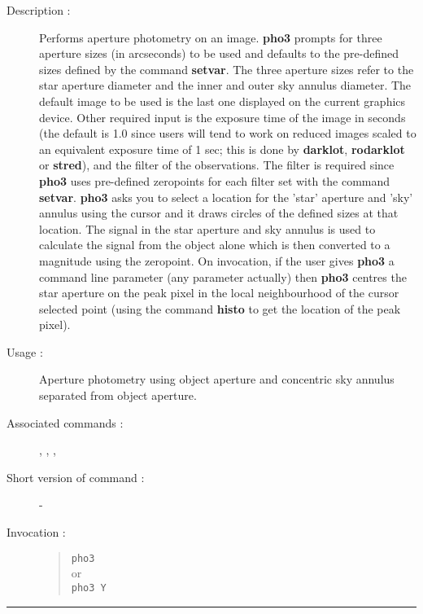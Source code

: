 \begin{description}

\item[Description :] Performs aperture photometry on an image.  {\bf
pho3} prompts for three aperture sizes (in arcseconds) to be used and
defaults to the pre-defined sizes defined by the command {\bf setvar}.
The three aperture sizes refer to the star aperture diameter and the
inner and outer sky annulus diameter.  The default image to be used is
the last one displayed on the current graphics device.  Other required
input is the exposure time of the image in seconds (the default is 1.0
since users will tend to work on reduced images scaled to an equivalent
exposure time of 1 sec; this is done by {\bf darklot}, {\bf rodarklot}
or {\bf stred}), and the filter of the observations.  The filter is
required since {\bf pho3} uses pre-defined zeropoints for each filter
set with the command {\bf setvar}. {\bf pho3} asks you to select a
location for the 'star' aperture and 'sky' annulus using the cursor and
it draws circles of the defined sizes at that location. The signal in
the star aperture and sky annulus is used to calculate the signal from
the object alone which is then converted to a magnitude using the
zeropoint.  On invocation, if the user gives {\bf pho3} a command line
parameter (any parameter actually) then {\bf pho3} centres the star
aperture on the peak pixel in the local neighbourhood of the cursor
selected point (using the command {\bf histo} to get the location of
the peak pixel).

\item [Usage :] Aperture photometry using object aperture and
concentric sky annulus separated from object aperture.

\item [Associated commands :] {\tt {}},
{\tt {}}, {\tt {}},
{\tt {}}

\item [Short version of command :] -

\item[Invocation :]

\begin{quote}{\tt  pho3 }\\
or \\
{\tt pho3 Y }
\end{quote}

\end{description}

\hrule
